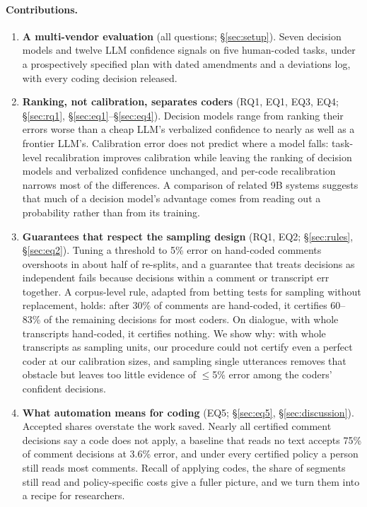 \paragraph{Contributions.}
\begin{enumerate}
  \item \textbf{A multi-vendor evaluation} (all questions; \S\ref{sec:setup}). Seven decision models and twelve LLM
  confidence signals on five human-coded tasks, under a prospectively specified plan with dated amendments and a deviations
  log, with every coding decision released.
  \item \textbf{Ranking, not calibration, separates coders} (RQ1, EQ1, EQ3, EQ4; \S\ref{sec:rq1}, \S\ref{sec:eq1}--\S\ref{sec:eq4}).
  Decision models range from ranking their errors worse than a cheap LLM's verbalized confidence to nearly as well as a
  frontier LLM's. Calibration error does not predict where a model falls: task-level recalibration improves calibration while
  leaving the ranking of decision models and verbalized confidence unchanged, and per-code recalibration narrows most of the
  differences. A comparison of related 9B systems
  suggests that much of a decision model's advantage comes from reading out a probability rather than from its training.
  \item \textbf{Guarantees that respect the sampling design} (RQ1, EQ2; \S\ref{sec:rules}, \S\ref{sec:eq2}). Tuning a
  threshold to 5\% error on hand-coded comments overshoots in about half of re-splits, and a guarantee that treats decisions as
  independent fails because decisions within a comment or transcript err together. A corpus-level rule, adapted from betting
  tests for sampling without replacement, holds: after 30\% of comments are hand-coded, it certifies 60--83\% of the remaining
  decisions for most coders. On dialogue, with whole transcripts hand-coded, it certifies nothing. We show why: with whole transcripts as sampling units, our
  procedure could not certify even a perfect coder at our calibration sizes, and sampling single utterances removes that
  obstacle but leaves too little evidence of $\le$5\% error among the coders' confident decisions.
  \item \textbf{What automation means for coding} (EQ5; \S\ref{sec:eq5}, \S\ref{sec:discussion}). Accepted shares overstate
  the work saved. Nearly all certified comment decisions say a code does not apply, a baseline that reads no text accepts 75\%
  of comment decisions at 3.6\% error, and under every certified policy a person still reads most comments. Recall of applying
  codes, the share of segments still read and policy-specific costs give a fuller picture, and we turn them into a recipe for
  researchers.
\end{enumerate}
